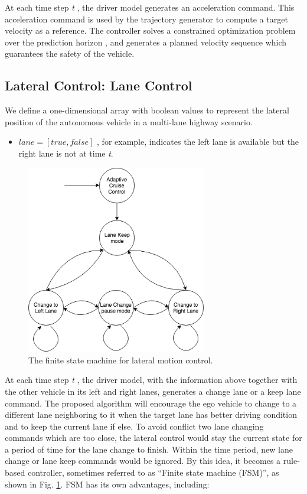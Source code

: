 At each time step \textit{t} , the driver model generates an acceleration command. This acceleration command is used by the trajectory generator to compute a target velocity as a reference. The controller solves a constrained optimization problem over the prediction horizon , and generates a planned velocity sequence which guarantees the safety of the vehicle.

\subsection{Lateral Control: Lane Control}

We define a one-dimensional array with boolean values to represent the lateral position of the autonomous vehicle in a multi-lane highway scenario.

\begin{itemize}
\item $lane = [true, false]$ , for example, indicates the left lane is available but the right lane is not at time \textit{t}.
\end{itemize}

\begin{figure}[h]
\centering
\includegraphics[width=0.7\textwidth]{figs/ch3/state-machine}
\caption{The finite state machine for lateral motion control.}
\label{fig:fsm}
\end{figure}

At each time step \textit{t} , the driver model, with the information above together with the other vehicle in its left and right lanes, generates a change lane or a keep lane command. The proposed algorithm will encourage the ego vehicle to change to a different lane neighboring to it when the target lane has better driving condition and to keep the current lane if else. To avoid conflict two lane changing commands which are too close, the lateral control would stay the current state for a period of time for the lane change to finish. Within the time period, new lane change or lane keep commands would be ignored. By this idea, it becomes a rule-based controller, sometimes referred to as ``Finite state machine (FSM)'', as shown in Fig. \ref{fig:fsm}. FSM has its own advantages, including:

